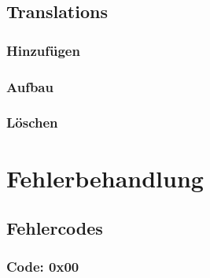 \documentclass{book}
\begin{document}
		\section{Translations}
			\subsection{Hinzufügen}
			\subsection{Aufbau}
			\subsection{Löschen}
	\chapter{Fehlerbehandlung}
		\section{Fehlercodes}
			\subsection*{Code: 0x00}
\end{document}
